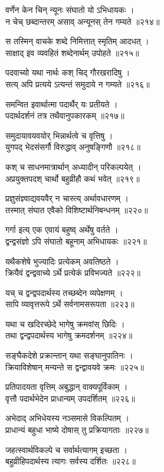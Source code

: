 वर्णेन केन चिन् न्यूनः संघातो यो ऽभिधायकः ।\\न चेच् छब्दान्तरम् असाव् अन्यूनस् तेन गम्यते ॥२१४॥

स तस्मिन् वाचके शब्दे निमित्तात् स्मृतिम् आदधत् ।\\साक्षाद् इव व्यवहितं शब्देनार्थम् उपोहते ॥२१५॥

पदवाच्यो यथा नार्थः कश् चिद् गौरखरादिषु ।\\सत्य् अपि प्रत्यये ऽत्यन्तं समुदाये न गम्यते ॥२१६॥

समन्वित इवार्थात्मा पदार्थैर् यः प्रतीयते ।\\पदार्थदर्शनं तत्र तथैवानुपकारकम् ॥२१७॥

समुदायावयवयोर् भिन्नार्थत्वे च वृत्तिषु ।\\युगपद् भेदसंसर्गौ विरुद्धाव् अनुषङ्गिणौ ॥२१८॥

कश् च साधनमात्रार्थान् अध्यादीन् परिकल्पयेत् ।\\अप्रयुक्तपदश् चार्थो बहुव्रीहौ कथं भवेत् ॥२१९॥

प्रज्ञुसंज्ञ्वाद्यवयवैर् न चास्त्य् अर्थावधारणम् ।\\तस्मात् संघात एवैको विशिष्टार्थनिबन्धनम् ॥२२०॥

गर्गा इत्य् एक एवायं बहुष्व् अर्थेषु वर्तते ।\\द्वन्द्वसंज्ञो ऽपि संघातो बहूनाम् अभिधायकः ॥२२१॥

यथैकशेषे भुज्यादिः प्रत्येकम् अवतिष्ठते ।\\क्रियैवं द्वन्द्ववाच्ये ऽर्थे प्रत्येकं प्रविभज्यते ॥२२२॥

यच् च द्वन्द्वपदार्थस्य तच्छब्देन व्यपेक्षणम् ।\\सापि व्यावृत्तरूपे ऽर्थे सर्वनामसरूपता ॥२२३॥

यथा च खदिरच्छेदे भागेषु क्रमवांस् छिदिः ।\\तथा द्वन्द्वपदार्थस्य भागेषु क्रमदर्शनम् ॥२२४॥

सङ्घैकदेशे प्रक्रान्तान् यथा सङ्घानुपातिनः ।\\क्रियाविशेषान् मन्यन्ते स द्वन्द्वावयवे क्रमः ॥२२५॥

प्रतिपादयता वृत्तिम् अबुद्धान् वाक्यपूर्विकाम् ।\\वृत्तौ पदार्थभेदेन प्राधान्यम् उपदर्शितम् ॥२२६॥

अभेदाद् अभिधेयस्य नञ्समासे विकल्पितम् ।\\प्राधान्यं बहुधा भाष्ये दोषास् तु प्रक्रियागताः ॥२२७॥

जहत्स्वार्थविकल्पे च सर्वार्थत्यागम् इच्छता ।\\बहुव्रीहिपदार्थस्य त्यागः सर्वस्य दर्शितः ॥२२८॥

